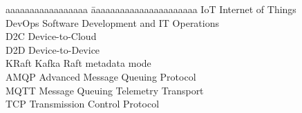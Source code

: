 
\newcommand{\abbrev}[2]{#1 \> #2\\ }
\begin{abbreviations}

\begin{tabbing}
  aaaaaaaaaaaaaaaaa \= aaaaaaaaaaaaaaaaaaaaaa\kill
  \abbrev{IoT}{Internet of Things}
  \abbrev{DevOps}{Software Development and IT Operations}
  \abbrev{D2C}{Device-to-Cloud}
  \abbrev{D2D}{Device-to-Device}
  \abbrev{KRaft}{Kafka Raft metadata mode}
  \abbrev{AMQP}{Advanced Message Queuing Protocol}
  \abbrev{MQTT}{Message Queuing Telemetry Transport}
  \abbrev{TCP}{Transmission Control Protocol}
\end{tabbing}
\end{abbreviations}